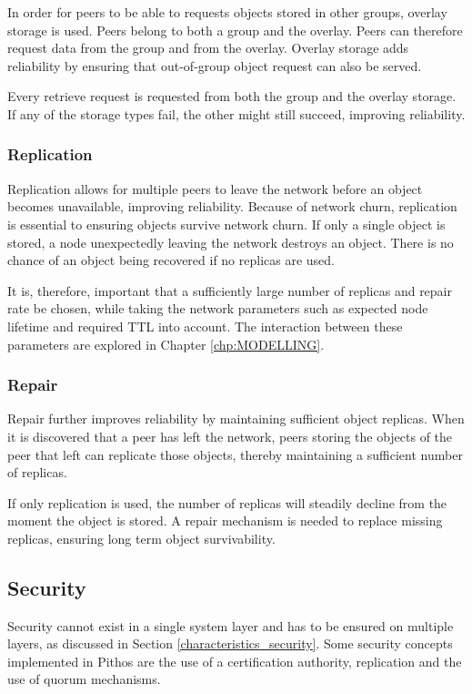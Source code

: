 In order for peers to be able to requests objects stored in other groups, overlay storage is used. Peers belong to both a group and the overlay. Peers can therefore request data from the group and from the overlay. Overlay storage adds reliability by ensuring that out-of-group object request can also be served.

Every retrieve request is requested from both the group and the overlay storage. If any of the storage types fail, the other might still succeed, improving reliability.

\subsubsection{Replication}

Replication allows for multiple peers to leave the network before an object becomes unavailable, improving reliability. Because of network churn, replication is essential to ensuring objects survive network churn. If only a single object is stored, a node unexpectedly leaving the network destroys an object. There is no chance of an object being recovered if no replicas are used.

It is, therefore, important that a sufficiently large number of replicas and repair rate be chosen, while taking the network parameters such as expected node lifetime and required TTL into account. The interaction between these parameters are explored in Chapter \ref{chp:MODELLING}.

\subsubsection{Repair}

Repair further improves reliability by maintaining sufficient object replicas. When it is discovered that a peer has left the network, peers storing the objects of the peer that left can replicate those objects, thereby maintaining a sufficient number of replicas.

If only replication is used, the number of replicas will steadily decline from the moment the object is stored. A repair mechanism is needed to replace missing replicas, ensuring long term object survivability.

\subsection{Security}

Security cannot exist in a single system layer and has to be ensured on multiple layers, as discussed in Section \ref{characteristics_security}. Some security concepts implemented in Pithos are the use of a certification authority, replication and the use of quorum mechanisms.

